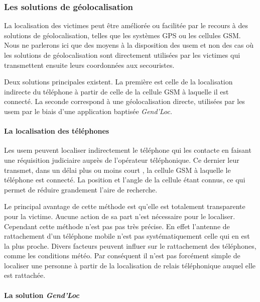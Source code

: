\subsubsection{Les solutions de géolocalisation}
\label{subsec:1-1-2-2}

La localisation des victimes peut être améliorée ou facilitée par le
recours à des solutions de géolocalisation, telles que les systèmes
GPS ou les cellules GSM. Nous ne parlerons ici que des moyens à la
disposition des \ac{usem} et non des cas où les solutions de
géolocalisation sont directement utilisées par les victimes qui
transmettent ensuite leurs coordonnées aux secouristes.

Deux solutions principales existent. La première est celle de la
localisation indirecte du téléphone à partir de celle de la cellule
GSM à laquelle il est connecté. La seconde correspond à une
géolocalisation directe, utilisées par les \ac{usem} par le biais
d'une application baptisée \emph{Gend'Loc.}

\paragraph{La localisation des téléphones}


Les \ac{usem} peuvent localiser indirectement le téléphone qui les
contacte en faisant une réquisition judiciaire auprès de l'opérateur
téléphonique. Ce dernier leur transmet, dans un délai plus ou moins
court , la cellule GSM à laquelle le téléphone est
connecté. La position et l'angle de la cellule étant connus, ce qui
permet de réduire grandement l'aire de recherche.

Le principal avantage de cette méthode est qu'elle est totalement
transparente pour la victime. Aucune action de sa part n'est
nécessaire pour le localiser. Cependant cette méthode n'est pas pas
très précise. En effet l'antenne de rattachement d'un téléphone mobile
n'est pas systématiquement celle qui en est la plus proche. Divers
facteurs peuvent influer sur le rattachement des téléphones, comme les
conditions météo.
% 
Par conséquent il n'est pas forcément simple de localiser une personne
à partir de la localisation de relais téléphonique auquel elle est
rattachée. 

\paragraph{La solution \emph{Gend'Loc}}

